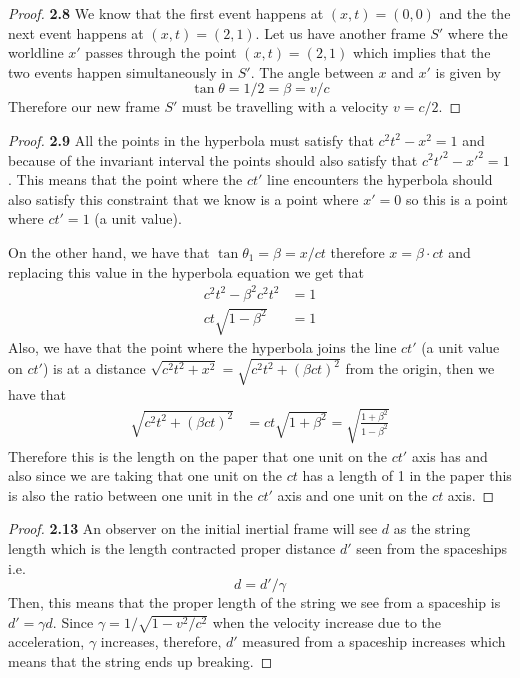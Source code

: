 \documentclass[11pt]{article}
\theoremstyle{definition}
\begin{document}
    \begin{proof}{\textbf{2.8}}
        We know that the first event happens at $(x,t) = (0,0)$ and the the next event
        happens at $(x,t) = (2,1)$. Let us have another frame $S'$ where the
        worldline $x'$ passes through the point $(x,t) = (2,1)$ which implies that the
        two events happen simultaneously in $S'$. The angle between $x$ and $x'$ is
        given by
        $$\tan\theta = 1/2 = \beta = v/c$$
        Therefore our new frame $S'$ must be travelling with a velocity $v = c/2$.
         
    \end{proof}
    \begin{proof}{\textbf{2.9}}
        All the points in the hyperbola must satisfy that $c^2t^2 - x^2= 1$ and because
        of the invariant interval the points should also satisfy that
        $c^2t'^2 - x'^2= 1$. This means that the point where the $ct'$ line encounters
        the hyperbola should also satisfy this constraint that we know is a point where
        $x' = 0$ so this is a point where $ct' = 1$ (a unit value).
        
        On the other hand, we have that $\tan \theta_1 = \beta = x/ct$ therefore
        $x= \beta \cdot ct$ and replacing this value in the hyperbola equation we get
        that
        \begin{align*}
            c^2t^2 - \beta^2c^2t^2 &= 1\\
            ct\sqrt{1 - \beta^2} &= 1
        \end{align*} 
        Also, we have that the point where the hyperbola joins the line $ct'$ (a unit
        value on $ct'$) is at a distance
        $\sqrt{c^2t^2 + x^2} = \sqrt{c^2t^2 + (\beta ct)^2}$ from the origin,
        then we have that 
        \begin{align*}
            \sqrt{c^2t^2 + (\beta ct)^2} &= ct\sqrt{1 + \beta^2} 
            = \sqrt{\frac{1 + \beta^2}{1 - \beta^2}}
        \end{align*}
        Therefore this is the length on the paper that one unit on the $ct'$ axis has
        and also since we are taking that one unit on the $ct$ has a length of 1 in the
        paper this is also the ratio between one unit in the $ct'$ axis and one
        unit on the $ct$ axis.
    \end{proof}
	\begin{proof}{\textbf{2.13}}
        An observer on the initial inertial frame will see $d$ as the string
        length which is the length contracted proper distance $d'$ seen from the
        spaceships i.e.
        $$d = d'/\gamma$$
        Then, this means that the proper length of the string we see from a spaceship is
        $d' = \gamma d$. Since $\gamma = 1/\sqrt{1 - v^2/c^2}$ when the velocity
        increase due to the acceleration, $\gamma$ increases, therefore, $d'$
        measured from a spaceship increases which means that the string ends up breaking.
    \end{proof}
\end{document}
